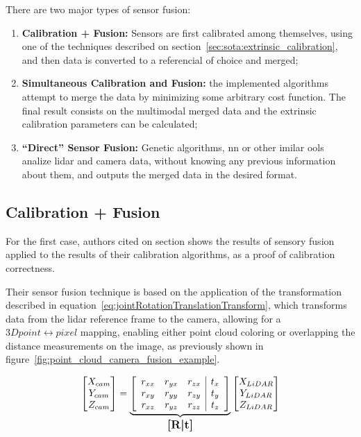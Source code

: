 There are two major types of sensor fusion: 

\begin{enumerate}
	\item \textbf{Calibration + Fusion:} Sensors are first calibrated among themselves, using one of the techniques described on section~\ref{sec:sota:extrinsic_calibration}, and then data is converted to a referencial of choice and merged;
	\item \textbf{Simultaneous Calibration and Fusion:} the implemented algorithms attempt to merge the data by minimizing some arbitrary cost function. The final result consists on the multimodal merged data and the extrinsic calibration parameters can be calculated;
	\item \textbf{``Direct'' Sensor Fusion:} Genetic algorithms, \ac{nn} or other imilar ools analize \ac{lidar} and camera data, without knowing any previous information about them, and outputs the merged data in the desired format.
\end{enumerate} 


\subsection{Calibration + Fusion}
For the first case, authors cited on section  shows the results of sensory fusion applied to the results of their calibration algorithms, as a proof of calibration correctness. 

Their sensor fusion technique is based on the application of the transformation described in equation~\ref{eq:jointRotationTranslationTransform}, which transforms data from the \ac{lidar} reference frame to the camera, allowing for a $3D point \leftrightarrow pixel$ mapping, enabling either point cloud coloring or overlapping the distance measurements on the image, as previously shown in figure~\ref{fig:point_cloud_camera_fusion_example}.
	
\begin{equation}
	\label{eq:jointRotationTranslationTransform}
	\begin{bmatrix}
		X_{cam} \\
		Y_{cam} \\
		Z_{cam} 
	\end{bmatrix}
	= 
		\underbrace{
	\left[
			\begin{array}{ccc|c}
				r_{xx} & r_{yx} & r_{zx} & t_x \\
					r_{xy} & r_{yy} & r_{zy} & t_y \\
					r_{xz} & r_{yz} & r_{zz} & t_z 
				\end{array}
		\right]
		}_\text{\large\textbf{[R|t]}}
	\begin{bmatrix}
		X_{LiDAR} \\
		Y_{LiDAR} \\
		Z_{LiDAR} 
	\end{bmatrix}
\end{equation}


